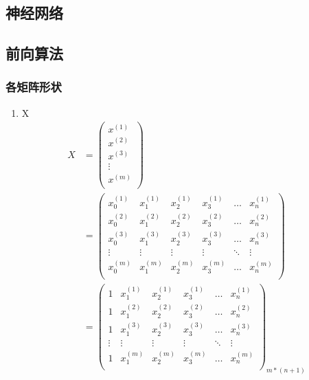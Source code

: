 \subsection{神经网络}
	

\subsection{前向算法}
\subsubsection{各矩阵形状}
\begin{enumerate}

\item X
\begin{equation} \begin{aligned}
	X & = \left(\begin{matrix}
			x^{(1)} \\ x^{(2)} \\ x^{(3)} \\ \vdots \\ x^{(m)} \\
		\end{matrix}\right) \\
	& = \left( \begin{matrix}
			x_0^{(1)} & x_1^{(1)} & x_2^{(1)} & x_3^{(1)} & \dots & x_n^{(1)} \\
			x_0^{(2)} & x_1^{(2)} & x_2^{(2)} & x_3^{(2)} & \dots & x_n^{(2)} \\
			x_0^{(3)} & x_1^{(3)} & x_2^{(3)} & x_3^{(3)} & \dots & x_n^{(3)} \\
			\vdots    & \vdots    & \vdots    & \vdots    & \ddots & \vdots   \\
			x_0^{(m)} & x_1^{(m)} & x_2^{(m)} & x_3^{(m)} & \dots & x_n^{(m)} \\
			\end{matrix}\right) \\
	& = \left(\begin{matrix}
			1 & x_1^{(1)} & x_2^{(1)} & x_3^{(1)} & \dots & x_n^{(1)} \\
			1 & x_1^{(2)} & x_2^{(2)} & x_3^{(2)} & \dots & x_n^{(2)} \\
			1 & x_1^{(3)} & x_2^{(3)} & x_3^{(3)} & \dots & x_n^{(3)} \\
			\vdots    & \vdots    & \vdots    & \vdots    & \ddots & \vdots   \\
			1 & x_1^{(m)} & x_2^{(m)} & x_3^{(m)} & \dots & x_n^{(m)} \\
		\end{matrix}\right)_{m*(n+1)}
\end{aligned} \end{equation}


\end{enumerate}
